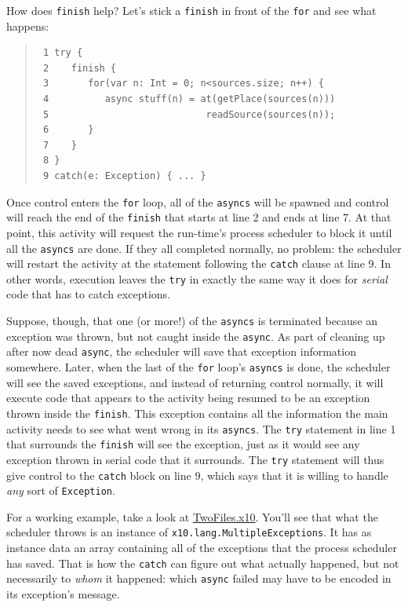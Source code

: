 How does {\tt finish} help?  Let's stick a {\tt finish} in front of the {\tt for} 
and see what happens:
\begin{quote}
\begin{verbatim}
 1 try {
 2    finish {
 3       for(var n: Int = 0; n<sources.size; n++) {
 4          async stuff(n) = at(getPlace(sources(n))) 
 5                            readSource(sources(n));
 6       }
 7    }
 8 }
 9 catch(e: Exception) { ... }
\end{verbatim}
\end{quote}

Once control enters the {\tt for} loop, all of the {\tt asyncs} will be spawned
and control will reach the end of the {\tt finish} that starts at line 2 and ends
at line 7.  At that point, this activity will request the \Xten{} run-time's process
scheduler to block it until all the {\tt asyncs} are done.  If they
all completed normally, no problem: the scheduler will restart the activity at
the statement following the {\tt catch} clause at line 9.  In other words,
execution leaves the {\tt try} in exactly the same way it does for {\em serial}
code that has to catch exceptions.

Suppose, though, that one (or more!) of the {\tt asyncs} is terminated because
an exception was thrown, but not caught inside the {\tt async}.  As part of
cleaning up after now dead {\tt async}, the \Xten{} scheduler will save that
exception information somewhere.  Later, when the last of the {\tt for}
loop's {\tt asyncs} is done, the scheduler will see the saved exceptions, and 
instead of returning control normally, it will execute code that appears to the
activity being resumed to be an exception thrown inside the {\tt finish}.  This
exception contains all the information the main activity needs to see what went
wrong in its {\tt asyncs}. The {\tt try} statement in line 1 that surrounds the
{\tt finish} will see the exception, just as it would see any exception thrown
in serial code that it surrounds. The {\tt try} statement will thus give
control to the {\tt catch} block on line 9, which says that it is willing to
handle {\em any} sort of {\tt Exception}.

For a working example, take a look at
\href{chapter-concurrency=src/files/TwoFiles.x10}{TwoFiles.x10}.
You'll see that what the scheduler throws is an instance of 
{\tt x10.lang.MultipleExceptions}.  It has as instance data an array containing
all of the exceptions that the process scheduler has saved. That is how the
{\tt catch} can figure out what actually happened, but not necessarily to
{\em whom} it happened: which {\tt async} failed may have to be encoded in its
exception's message.

